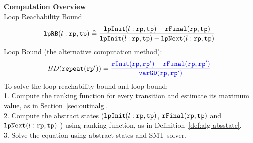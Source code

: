 \textbf{Computation Overview}
\\
 Loop Reachability Bound
\[
  \mathtt{lpRB}(l: \mathtt{rp}, \mathtt{tp}) \triangleq
    \frac{\mathtt{lpInit}(l: \mathtt{rp}, \mathtt{tp}) - \mathtt{rFinal}(\mathtt{rp}, \mathtt{tp})}{\mathtt{lpInit}(l: \mathtt{rp}, \mathtt{tp}) - \mathtt{lpNext}(l: \mathtt{rp}, \mathtt{tp})}
\]
 Loop Bound (the alternative computation method):
  \[
    BD(\rprepeat(\rprog')) = \highlight{\frac{\rfinit(\rprog, \rprog') - \rffinal(\rprog, \rprog')}{\varGD(\rprog, \rprog')}}
\]
  To solve the loop reachability bound and loop bound:
  \\
  1. Compute the ranking function for every transition and estimate its maximum value, as in Section~\ref{sec:outinalg}.
  \\
  2. Compute the abstract states ($\mathtt{lpInit}(l: \mathtt{rp}, \mathtt{tp})$, $\mathtt{rFinal}(\mathtt{rp}, \mathtt{tp})$ and $\mathtt{lpNext}(l: \mathtt{rp}, \mathtt{tp})$ ) using ranking function,
  as in Definition~\ref{def:alg-absstate}.
  \\
  3. Solve the equation using abstract states and SMT solver.
